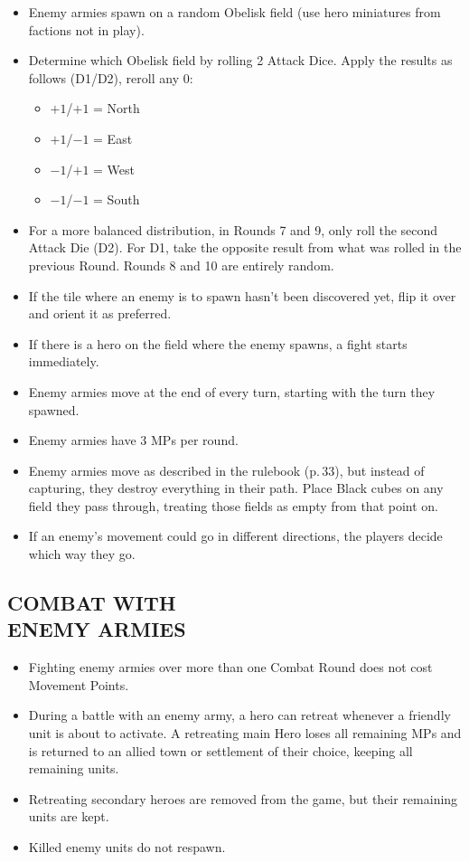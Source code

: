 \begin{multicols}{2}
\begin{itemize}
  \item Enemy armies spawn on a random Obelisk field (use hero miniatures from factions not in play).
  \item Determine which Obelisk field by rolling 2 Attack Dice. Apply the results as follows (D1/D2), reroll any 0:
  \begin{itemize}
    \item $+1$/$+1$ = North
    \item $+1$/$-1$ = East
    \item $-1$/$+1$ = West
    \item $-1$/$-1$ = South
  \end{itemize}
  \item For a more balanced distribution, in Rounds 7 and 9, only roll the second Attack Die (D2). For D1, take the opposite result from what was rolled in the previous Round.
  Rounds 8 and 10 are entirely random.
  \item If the tile where an enemy is to spawn hasn't been discovered yet, flip it over and orient it as preferred.
  \item If there is a hero on the field where the enemy spawns, a fight starts immediately.
  \item Enemy armies move at the end of every turn, starting with the turn they spawned.
  \item Enemy armies have 3 MPs per round.
  \item Enemy armies move as described in the rulebook (p.\,33), but instead of capturing, they destroy everything in their path.
    Place Black cubes on any field they pass through, treating those fields as empty from that point on.
  \item If an enemy's movement could go in different directions, the players decide which way they go.
\end{itemize}

\subsection*{\MakeUppercase{Combat with\\Enemy Armies}}

\begin{itemize}
  \item Fighting enemy armies over more than one Combat Round does not cost Movement Points.
  \item During a battle with an enemy army, a hero can retreat whenever a friendly unit is about to activate.
    A retreating main Hero loses all remaining MPs and is returned to an allied town or settlement of their choice, keeping all remaining units.
  \item Retreating secondary heroes are removed from the game, but their remaining units are kept.
  \item Killed enemy units do not respawn.
\end{itemize}


\end{multicols}
